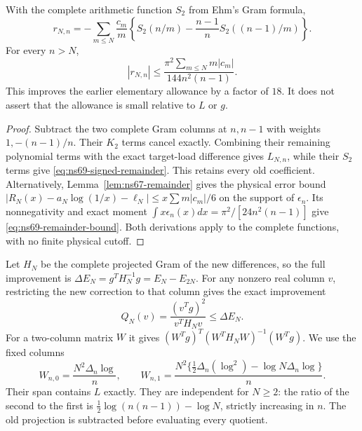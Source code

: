 \begin{proposition}
\label{prop:ns69-remainder}
With the complete arithmetic function $S_2$ from Ehm's Gram formula,
\begin{equation}
 r_{N,n}=-\sum_{m\leq N}\frac{c_m}{m}
       \left\{S_2(n/m)-\frac{n-1}{n}S_2((n-1)/m)\right\}.
 \label{eq:ns69-signed-remainder}
\end{equation}
For every $n>N$,
\begin{equation}
 |r_{N,n}|\leq
 \frac{\pi^2\sum_{m\leq N}m|c_m|}{144n^2(n-1)}.
 \label{eq:ns69-remainder-bound}
\end{equation}
This improves the earlier elementary allowance by a factor of $18$.
It does not assert that the allowance is small relative to $L$ or $g$.
\end{proposition}
\begin{proof}
Subtract the two complete Gram columns at $n,n-1$ with weights
$1,-(n-1)/n$. Their $K_2$ terms cancel exactly. Combining their
remaining polynomial terms with the exact target-load difference
gives $L_{N,n}$, while their $S_2$ terms give
\eqref{eq:ns69-signed-remainder}. This retains every old coefficient.
Alternatively, Lemma~\ref{lem:ns67-remainder} gives the physical
error bound
$|R_N(x)-a_N\log(1/x)-\ell_N|\leq x\sum m|c_m|/6$
on the support of $\epsilon_n$. Its nonnegativity and exact moment
$\int x\epsilon_n(x)dx=\pi^2/[24n^2(n-1)]$ give
\eqref{eq:ns69-remainder-bound}. Both derivations apply to the
complete functions, with no finite physical cutoff.
\end{proof}

Let $H_N$ be the complete projected Gram of the new differences, so
the full improvement is $\Delta E_N=g^T H_N^{-1}g=E_N-E_{2N}$.
For any nonzero real column $v$, restricting the new correction to
that column gives the exact improvement
\begin{equation}
 Q_N(v)=\frac{(v^Tg)^2}{v^TH_Nv}\leq\Delta E_N.
 \label{eq:ns69-selected-gain}
\end{equation}
For a two-column matrix $W$ it gives
$(W^Tg)^T(W^TH_NW)^{-1}(W^Tg)$. We use the fixed columns
\[
 W_{n,0}=\frac{N^2\Delta_n\log}{n},\qquad
 W_{n,1}=\frac{N^2\{\tfrac12\Delta_n(\log^2)
                                      -\log N\Delta_n\log\}}{n}.
\]
Their span contains $L$ exactly. They are independent for $N\geq2$:
the ratio of the second to the first is
$\tfrac12\log(n(n-1))-\log N$, strictly increasing in $n$.
The old projection is subtracted before evaluating every quotient.

